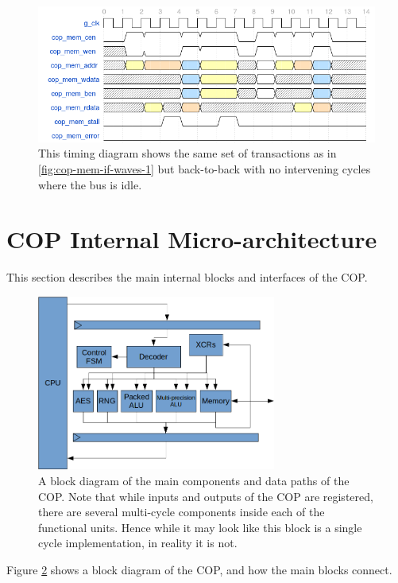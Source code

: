 \documentclass{scarv-report}
\begin{document}
\begin{figure}[h]
\centering
\includegraphics[width=\textwidth]{image/cop-mem-if-2.png}
\caption{This timing diagram shows the same set of transactions as in
\ref{fig:cop-mem-if-waves-1} but back-to-back with no intervening cycles
where the bus is idle.}
\label{fig:cop-mem-if-waves-2}
\end{figure}


\section{COP Internal Micro-architecture}
\label{sec:cop-microarch}

This section describes the main internal blocks and interfaces of the COP.

\begin{figure}[H]
\centering
\includegraphics[width=0.7\textwidth]{image/cop-block-diagram.png}
\caption{A block diagram of the main components and data paths of
the COP. Note that while inputs and outputs of the COP are registered,
there are several multi-cycle components inside each of the functional
units. Hence while it may look like this block is a single cycle
implementation, in reality it is not.}
\label{fig:cop-block-diagram}
\end{figure}

Figure \ref{fig:cop-block-diagram} shows a block diagram of the COP,
and how the main blocks connect.
\end{document}
